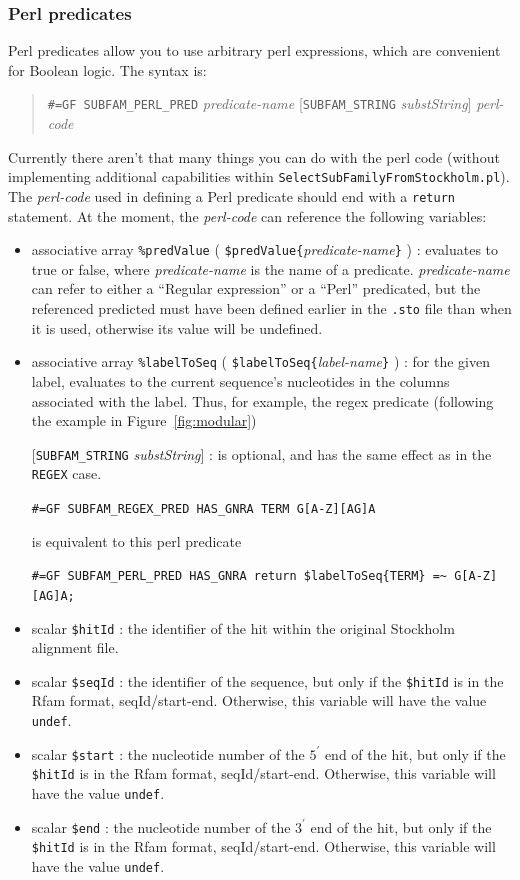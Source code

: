 \documentclass[letterpaper,12pt]{report}
\newcommand{\example}[1]{
\begin{quote}
{\raggedright
#1
}
\end{quote}
}
\begin{document}
\subsubsection{Perl predicates}

Perl predicates allow you to use arbitrary perl expressions, which are
convenient for Boolean logic.  The syntax is:

\example{{\tt \#=GF SUBFAM\_PERL\_PRED}  \textit{predicate-name}  [{\tt SUBFAM\_STRING} \textit{substString}]  \textit{perl-code}}

Currently there aren{\textquoteright}t that many things you can do with
the perl code (without implementing additional capabilities within
{\tt SelectSubFamilyFromStockholm.pl}).  
The {\it perl-code} used in defining a Perl predicate should end with a {\tt return} statement.
At the moment, the {\it perl-code} can reference the following variables:
\begin{itemize}
\item associative array {\tt \%predValue} (  {\tt \$predValue\{}\textit{predicate-name}{\tt \}} ) :
evaluates to true or false, where {\it predicate-name} is the name of a predicate.  {\it predicate-name} can refer to either a ``Regular expression'' or a ``Perl'' predicated, but the referenced predicted must have been defined earlier in the {\tt .sto} file than when it is used, otherwise its value will be undefined.
\item associative array {\tt \%labelToSeq} ( {\tt \$labelToSeq\{}\textit{label-name}{\tt \}} ) :
for the given label, evaluates to the current sequence's nucleotides in the columns associated with the label.  Thus, for example, the regex predicate (following the example in Figure~\ref{fig:modular})

[{\tt SUBFAM\_STRING} \textit{substString}] : is optional, and has the same effect as in the {\tt REGEX} case.

{\tt \#=GF SUBFAM\_REGEX\_PRED HAS\_GNRA TERM G[A-Z][AG]A}

is equivalent to this perl predicate

{\tt \#=GF SUBFAM\_PERL\_PRED HAS\_GNRA return \$labelToSeq\{TERM\} =\textasciitilde{} G[A-Z][AG]A;}
\item scalar {\tt \$hitId} : the identifier of the hit within the original Stockholm alignment file.
\item scalar {\tt \$seqId} : the identifier of the sequence, but only if the {\tt \$hitId} is in the Rfam format, seqId/start-end.  Otherwise, this variable will have the value {\tt undef}.
\item scalar {\tt \$start} : the nucleotide number of the $5^\prime$ end of the hit, but only if the {\tt \$hitId} is in the Rfam format, seqId/start-end.  Otherwise, this variable will have the value {\tt undef}.
\item scalar {\tt \$end} : the nucleotide number of the $3^\prime$ end of the hit, but only if the {\tt \$hitId} is in the Rfam format, seqId/start-end.  Otherwise, this variable will have the value {\tt undef}.
\end{itemize}
\end{document}
